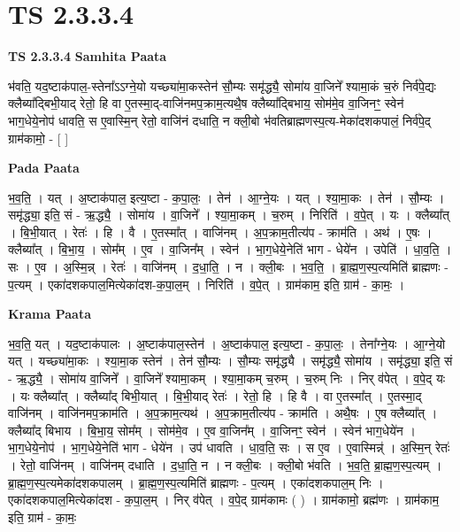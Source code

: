 \documentclass[17pt]{extarticle}
\begin{document}
\section{ TS 2.3.3.4 }

\textbf{TS 2.3.3.4 } \newline
\textbf{Samhita Paata} \newline

भ॑वति॒ यद॒ष्टाक॑पाल॒-स्तेना᳚ऽऽग्ने॒यो यच्छ्या॑मा॒कस्तेन॑ सौ॒म्यः समृ॑द्ध्यै॒ सोमा॑य वा॒जिने᳚ श्यामा॒कं च॒रुं निर्व॑पे॒द्यः क्लैब्या᳚द्बिभी॒याद् रेतो॒ हि वा ए॒तस्मा॒द्-वाजि॑नमप॒क्राम॒त्यथै॒ष क्लैब्या᳚द्बिभाय॒ सोम॑मे॒व वा॒जिनꣳ॒॒ स्वेन॑ भाग॒धेये॒नोप॑ धावति॒ स ए॒वास्मि॒न् रेतो॒ वाजि॑नं दधाति॒ न क्ली॒बो भ॑वतिब्राह्मणस्प॒त्य-मेका॑दशकपालं॒ निर्व॑पे॒द् ग्राम॑कामो॒ - [  ] \newline

\textbf{Pada Paata} \newline

भ॒व॒ति॒ । यत् । अ॒ष्टाक॑पाल॒ इत्य॒ष्टा - क॒पा॒लः॒ । तेन॑ । आ॒ग्ने॒यः । यत् । श्या॒मा॒कः । तेन॑ । सौ॒म्यः । समृ॑द्ध्या॒ इति॒ सं - ऋ॒द्ध्यै॒ । सोमा॑य । वा॒जिने᳚ । श्या॒मा॒कम् । च॒रुम् । निरिति॑ । व॒पे॒त् । यः । क्लैब्या᳚त् । बि॒भी॒यात् । रेतः॑ । हि । वै । ए॒तस्मा᳚त् । वाजि॑नम् । अ॒प॒क्राम॒तीत्य॑प - क्राम॑ति । अथ॑ । ए॒षः । क्लैब्या᳚त् । बि॒भा॒य॒ । सोम᳚म् । ए॒व । वा॒जिन᳚म् । स्वेन॑ । भा॒ग॒धेये॒नेति॑ भाग - धेये॑न । उपेति॑ । धा॒व॒ति॒ । सः । ए॒व । अ॒स्मि॒न्न् । रेतः॑ । वाजि॑नम् । द॒धा॒ति॒ । न । क्ली॒बः । भ॒व॒ति॒ । ब्रा॒ह्म॒ण॒स्प॒त्यमिति॑ ब्राह्मणः - प॒त्यम् । एका॑दशकपाल॒मित्येका॑दश-क॒पा॒ल॒म् । निरिति॑ । व॒पे॒त् । ग्राम॑काम॒ इति॒ ग्राम॑ - का॒मः॒ ।  \newline


\textbf{Krama Paata} \newline

भ॒व॒ति॒ यत् । यद॒ष्टाक॑पालः । अ॒ष्टाक॑पाल॒स्तेन॑ । अ॒ष्टाक॑पाल॒ इत्य॒ष्टा - क॒पा॒लः॒ । तेना᳚ग्ने॒यः । आ॒ग्ने॒यो यत् । यच्छ्या॑मा॒कः । श्या॒मा॒क स्तेन॑ । तेन॑ सौ॒म्यः । सौ॒म्यः समृ॑द्ध्यै । समृ॑द्ध्यै॒ सोमा॑य । समृ॑द्ध्या॒ इति॒ सं - ऋ॒द्ध्यै॒ । सोमा॑य वा॒जिने᳚ । वा॒जिने᳚ श्यामा॒कम् । श्या॒मा॒कम् च॒रुम् । च॒रुम् निः । निर् व॑पेत् । व॒पे॒द् यः । यः क्लैब्या᳚त् । क्लैब्या᳚द् बिभी॒यात् । बि॒भी॒याद् रेतः॑ । रेतो॒ हि । हि वै । वा ए॒तस्मा᳚त् । ए॒तस्मा॒द् वाजि॑नम् । वाजि॑नमप॒क्राम॑ति । अ॒प॒क्राम॒त्यथ॑ । अ॒प॒क्राम॒तीत्य॑प - क्राम॑ति । अथै॒षः । ए॒ष क्लैब्या᳚त् । क्लैब्या᳚द् बिभाय । बि॒भा॒य॒ सोम᳚म् । सोम॑मे॒व । ए॒व वा॒जिन᳚म् । वा॒जिनꣳ॒॒ स्वेन॑ । स्वेन॑ भाग॒धेये॑न । भा॒ग॒धेये॒नोप॑ । भा॒ग॒धेये॒नेति॑ भाग - धेये॑न । उप॑ धावति । धा॒व॒ति॒ सः । स ए॒व । ए॒वास्मिन्न्॑ । अ॒स्मि॒न् रेतः॑ । रेतो॒ वाजि॑नम् । वाजि॑नम् दधाति । द॒धा॒ति॒ न । न क्ली॒बः । क्ली॒बो भ॑वति । भ॒व॒ति॒ ब्रा॒ह्म॒ण॒स्प॒त्यम् । ब्रा॒ह्म॒ण॒स्प॒त्यमेका॑दशकपालम् । ब्रा॒ह्म॒ण॒स्प॒त्यमिति॑ ब्राह्मणः - प॒त्यम् । एका॑दशकपाल॒म् निः । एका॑दशकपाल॒मित्येका॑दश - क॒पा॒ल॒म् । निर् व॑पेत् । व॒पे॒द् ग्राम॑कामः ( ) 
। ग्राम॑कामो॒ ब्रह्म॑णः । ग्राम॑काम॒ इति॒ ग्राम॑ - का॒मः॒ \newline
\end{document}
